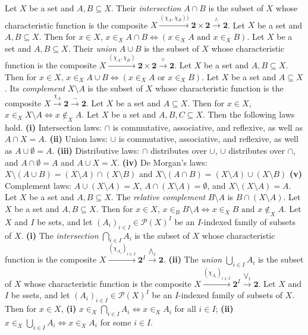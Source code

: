  Let $X$ be a set and $A, B \subseteq X$. Their \textit{intersection} $A \cap B$ is the subset of $X$ whose characteristic function is the composite $X \xrightarrow{(\chi_A, \chi_B))} \mathbf{2} \times \mathbf{2} \xrightarrow{\wedge} \mathbf{2}$.
 Let $X$ be a set and $A, B \subseteq X$. Then for $x \in X$, $x \in_X A \cap B \iff (x \in_X A \text{ and } x \in_X B)$.
 Let $X$ be a set and $A, B \subseteq X$. Their \textit{union} $A \cup B$ is the subset of $X$ whose characteristic function is the composite $X \xrightarrow{(\chi_A, \chi_B)} \mathbf{2} \times \mathbf{2} \xrightarrow{\vee} \mathbf{2}$.
 Let $X$ be a set and $A, B \subseteq X$. Then for $x \in X$, $x \in_X A \cup B \iff (x \in_X A \text{ or } x \in_X B)$.
 Let $X$ be a set and $A \subseteq X$. Its \textit{complement} $X \setminus A$ is the subset of $X$ whose characteristic function is the composite $X \xrightarrow{\chi_A} \mathbf{2} \xrightarrow{\neg} \mathbf{2}$.
 Let $X$ be a set and $A \subseteq X$. Then for $x \in X$, $x \in_X X \setminus A \iff x \not \in_X A$.
 Let $X$ be a set and $A, B, C \subseteq X$. Then the following laws hold. \textbf{(i)} Intersection laws: $\cap$ is commutative, associative, and reflexive, as well as $A \cap X = A$. \textbf{(ii)} Union laws: $\cup$ is commutative, associative, and reflexive, as well as $A \cup \emptyset = A$. \textbf{(iii)} Distributive laws: $\cap$ distributes over $\cup$, $\cup$ distributes over $\cap$, and $A \cap \emptyset = A$ and $A \cup X = X$. \textbf{(iv)} De Morgan's laws: $X \setminus (A \cup B) = (X \setminus A) \cap (X \setminus B)$ and $X \setminus (A \cap B) = (X \setminus A) \cup (X \setminus B)$ \textbf{(v)} Complement laws: $A \cup (X \setminus A) = X$, $A \cap (X \setminus A) = \emptyset$, and $X \setminus (X \setminus A) = A$.
 Let $X$ be a set and $A, B \subseteq X$. The \textit{relative complement} $B \setminus A$ is $B \cap (X \setminus A)$.
 Let $X$ be a set and $A, B \subseteq X$. Then for $x \in X$, $x \in_B B \setminus A \iff x \in_X B \text{ and } x \not \in_X A$.
 Let $X$ and $I$ be sets, and let $(A_i)_{i \in I} \in \mathscr{P}(X)^I$ be an $I$-indexed family of subsets of $X$. \textbf{(i)} The \textit{intersection} $\bigcap_{i \in I} A_i$ is the subset of $X$ whose characteristic function is the composite $X \xrightarrow{(\chi_{A_i})_{i \in I}} \mathbf{2}^I \xrightarrow{\bigwedge_I} \mathbf{2}$. \textbf{(ii)} The \textit{union} $\bigcup_{i \in I} A_i$ is the subset of $X$ whose characteristic function is the composite $X \xrightarrow{(\chi_{A_i})_{i \in I}} \mathbf{2}^I \xrightarrow{\bigvee_I} \mathbf{2}$.
 Let $X$ and $I$ be ssets, and let $(A_i)_{i \in I} \in \mathscr{P}(X)^I$ be an $I$-indexed family of subsets of $X$. Then for $x \in X$, \textbf{(i)} $x \in_X \bigcap_{i \in I} A_i \iff x \in_X A_i$ for all $i \in I$; \textbf{(ii)} $x \in_X \bigcup_{i \in I} A_i \iff x \in_X A_i$ for some $i \in I$.
